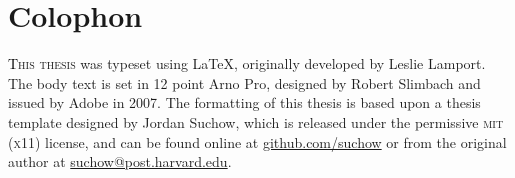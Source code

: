 \chapter*{Colophon}

\begin{center}
\parbox{200pt}{\raggedright\lettrine[lines=3,slope=-2pt,nindent=-4pt]
{\textcolor{black}{T}}{his thesis} was typeset using \LaTeX, originally developed by
Leslie Lamport. The body text is set in 12 point Arno Pro,
designed by Robert Slimbach and issued 
by Adobe in 2007. The formatting of this thesis is based upon a thesis
template designed by Jordan Suchow, which is released under the permissive \textsc{mit} (\textsc{x}11) 
license, and can be found online at \href{https://github.com/suchow/}{github.com/suchow} or from the 
original author at \href{mailto:suchow@fas.harvard.edu}{suchow@post.harvard.edu}.}
\end{center}
